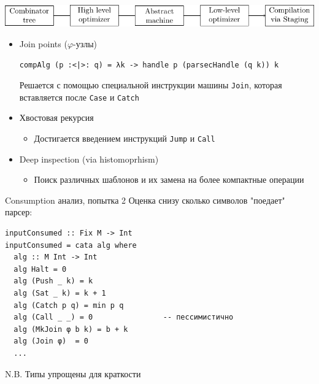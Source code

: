 \begin{frame}[fragile]{}
\includegraphics[page=5]{pipeline}
\begin{itemize}
\item Join points ($\varphi$-узлы) 
\begin{verbatim}
compAlg (p :<|>: q) = λk -> handle p (parsecHandle (q k)) k
\end{verbatim}
Решается с помощью специальной инструкции машины \texttt{Join}, которая вставляется после 
\texttt{Case} и \texttt{Catch}
\item Хвостовая рекурсия
\begin{itemize}
\item Достигается введением инструкций \texttt{Jump} и \texttt{Call}
\end{itemize}
\item Deep inspection (via histomoprhism)
\begin{itemize}
\item Поиск различных шаблонов и их замена на более компактные операции
\end{itemize}
\end{itemize}

\end{frame}

\begin{frame}[fragile]{Consumption анализ, попытка 2}
Оценка снизу сколько символов "поедает" парсер:
\begin{verbatim}
inputConsumed :: Fix M -> Int
inputConsumed = cata alg where 
  alg :: M Int -> Int
  alg Halt = 0
  alg (Push _ k) = k
  alg (Sat _ k) = k + 1
  alg (Catch p q) = min p q
  alg (Call _ _) = 0                -- пессимистично
  alg (MkJoin φ b k) = b + k
  alg (Join φ)  = 0
  ...
\end{verbatim}

N.B. Типы упрощены для краткости
\end{frame}

